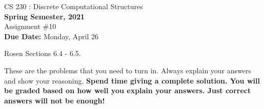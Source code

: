 \documentclass[11pt]{article}
\begin{document}
    \begin{center}
    {{\large CS 230 : Discrete Computational Structures}}
        \\


        {\bf Spring Semester, 2021}\\

        {\sc Assignment \#10} \\
        {\bf Due Date:} Monday, April 26
    \end{center}

     Rosen Sections 6.4 - 6.5.

    These are the problems that you need to turn in. Always explain your answers and show your reasoning.
    {\bf Spend time giving a complete solution. You will be graded based on how well you explain your answers.
    Just correct answers will not be enough!}

\end{document}
